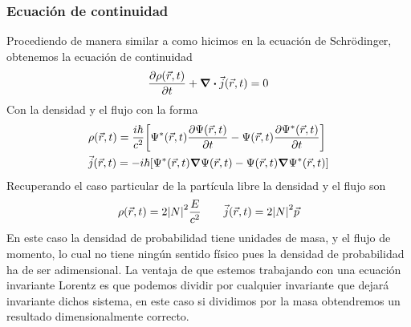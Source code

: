 \subsubsection{Ecuación de continuidad}
Procediendo de manera similar a como hicimos en la ecuación de Schrödinger, obtenemos la ecuación de continuidad $$\pdv{\rho\qty(\vec{r},t)}{t}+ \div{\vec{j}(\vec{r},t)}=0$$
Con la densidad y el flujo con la forma
\begin{equation}
    \begin{aligned}
            &\rho(\vec{r},t) =\frac{i\hbar}{c^2}\qty[\Psi^*(\vec{r},t)\pdv{\Psi(\vec{r},t)}{t}-\Psi(\vec{r},t)\pdv{\Psi^*(\vec{r},t)}{t}]\\
    &\vec{j}(\vec{r},t)=-i\hbar \qty[\Psi^*(\vec{r},t)\grad \Psi(\vec{r},t)-\Psi(\vec{r},t)\grad \Psi^*(\vec{r},t)]
    \end{aligned}
\end{equation}
Recuperando el caso particular de la partícula libre la densidad y el flujo son 
\begin{equation}
    \rho(\vec{r},t)=2\abs{N}^2\frac{E}{c^2} \quad \quad \vec{j}(\vec{r},t)=2 \abs{N}^2 \vec{p}
    \label{eq: dens prob y flujo K-G}
\end{equation}
En este caso la densidad de probabilidad tiene unidades de masa, y el flujo de momento, lo cual no tiene ningún sentido físico pues la densidad de probabilidad ha de ser adimensional. La ventaja de que estemos trabajando con una ecuación invariante Lorentz es que podemos dividir por cualquier invariante que dejará invariante dichos sistema, en este caso si dividimos por la masa obtendremos un resultado dimensionalmente correcto.
\newpage
